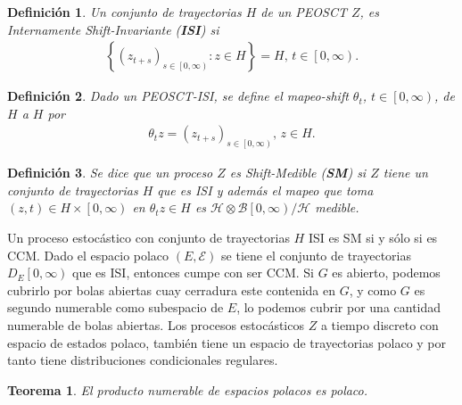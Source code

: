 \documentclass{article}
\newtheorem{Def}{Definición}
\newtheorem{Teo}{Teorema}
\begin{document}
\begin{Def}
Un conjunto de trayectorias $H$ de un PEOSCT $Z$, es Internamente Shift-Invariante (\textbf{ISI}) si 
\begin{eqnarray*}
\left\{\left(z_{t+s}\right)_{s\in\left[0,\infty\right)}:z\in H\right\}=H\textrm{, }t\in\left[0,\infty\right).
\end{eqnarray*}
\end{Def}


\begin{Def}
Dado un PEOSCT-ISI, se define el mapeo-shift $\theta_{t}$, $t\in\left[0,\infty\right)$, de $H$ a $H$ por 
\begin{eqnarray*}
\theta_{t}z=\left(z_{t+s}\right)_{s\in\left[0,\infty\right)}\textrm{, }z\in H.
\end{eqnarray*}
\end{Def}

\begin{Def}
Se dice que un proceso $Z$ es Shift-Medible (\textbf{SM}) si $Z$ tiene un conjunto de trayectorias $H$ que es ISI y adem\'as el mapeo que toma $\left(z,t\right)\in H\times\left[0,\infty\right)$ en $\theta_{t}z\in H$ es $\mathcal{H}\otimes\mathcal{B}\left[0,\infty\right)/\mathcal{H}$ medible.
\end{Def}

Un proceso estoc\'astico con conjunto de trayectorias $H$ ISI es SM si y s\'olo si es CCM. Dado el espacio polaco $\left(E,\mathcal{E}\right)$ se tiene el  conjunto de trayectorias $D_{E}\left[0,\infty\right)$ que es ISI, entonces cumpe con ser CCM. Si $G$ es abierto, podemos cubrirlo por bolas abiertas cuay cerradura este contenida en $G$, y como $G$ es segundo numerable como subespacio de $E$, lo podemos cubrir por una cantidad numerable de bolas abiertas. Los procesos estoc\'asticos $Z$ a tiempo discreto con espacio de estados polaco, tambi\'en tiene un espacio de trayectorias polaco y por tanto tiene distribuciones condicionales regulares.

\begin{Teo}
El producto numerable de espacios polacos es polaco.
\end{Teo}
\end{document}

